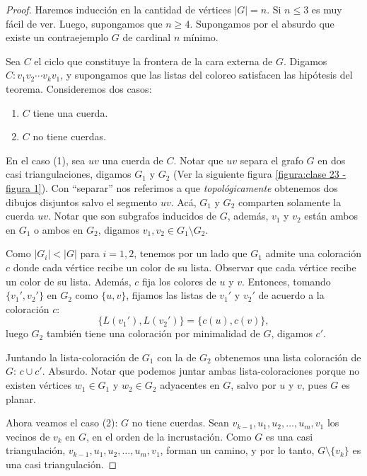 \documentclass[12pt]{report}
\theoremstyle{plain}
\theoremstyle{definition}
\newcommand{\abs}[1]{\left \vert #1 \right \vert}
\begin{document}
\begin{proof}
Haremos inducción en la cantidad de vértices $\abs G = n$. Si $n \leq 3$ es muy fácil de ver. Luego, supongamos que $n \geq 4$. Supongamos por el absurdo que existe un contraejemplo $G$ de cardinal $n$ mínimo.

Sea $C$ el ciclo que constituye la frontera de la cara externa de $G$. Digamos $C : v_1 v_2 \cdots v_k v_1$, y supongamos que las listas del coloreo satisfacen las hipótesis del teorema. Consideremos dos casos:
\begin{enumerate}[(1)]
\item $C$ tiene una cuerda.
\item $C$ no tiene cuerdas.
\end{enumerate}

En el caso (1), sea $uv$ una cuerda de $C$. Notar que $uv$ separa el grafo $G$ en dos casi triangulaciones, digamos $G_1$ y $G_2$ (Ver la siguiente figura \ref{figura:clase 23 - figura 1}). Con ``separar'' nos referimos a que \textit{topológicamente} obtenemos dos dibujos disjuntos salvo el segmento $uv$. Acá, $G_1$ y $G_2$ comparten solamente la cuerda $uv$. Notar que son subgrafos inducidos de $G$, además, $v_1$ y $v_2$ están ambos en $G_1$ o ambos en $G_2$, digamos $v_1,v_2 \in G_1 \setminus G_2$.

\label{figura:clase 23 - figura 1}

Como $\abs{G_i} < \abs{G}$ para $i = 1, 2$, tenemos por un lado que $G_1$ admite una coloración $c$ donde cada vértice recibe un color de su lista. Observar que cada vértice recibe un color de su lista. Además, $c$ fija los colores de $u$ y $v$. Entonces, tomando $\{v_1',v_2'\}$ en $G_2$ como $\{u,v\}$, fijamos las listas de $v_1'$ y $v_2'$ de acuerdo a la coloración $c$:
\[
    \{L(v_1'), L(v_2') \} = \{c(u), c(v)\},
\]
luego $G_2$ también tiene una coloración por minimalidad de $G$, digamos $c'$.

Juntando la lista-coloración de $G_1$ con la de $G_2$ obtenemos una lista coloración de $G$: $c \cup c'$. Absurdo. Notar que podemos juntar ambas lista-coloraciones porque no existen vértices $w_1 \in G_1$ y $w_2 \in G_2$ adyacentes en $G$, salvo por $u$ y $v$, pues $G$ es planar.

\bigskip

Ahora veamos el caso (2): $G$ no tiene cuerdas. Sean $v_{k-1}, u_1, u_2, \ldots, u_m, v_1$ los vecinos de $v_k$ en $G$, en el orden de la incrustación. Como $G$ es una casi triangulación, $v_{k-1}, u_1, u_2, \ldots, u_m, v_1$, forman un camino, y por lo tanto, $G\setminus \{v_k\}$ es una casi triangulación.


\end{proof}
\end{document}
